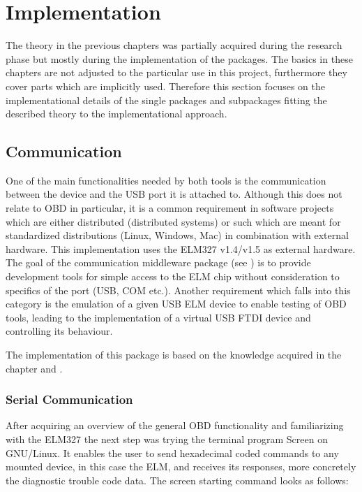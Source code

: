 
\chapter{Implementation}
\label{sec:impl}
The theory in the previous chapters was partially acquired during the research phase but mostly during the implementation of the packages. 
The basics in these chapters are not adjusted to the particular use in this project, furthermore they cover parts which are implicitly used. 
Therefore this section focuses on the implementational details of the single packages and subpackages fitting the described theory to the 
implementational approach.

\section{Communication}
\label{sec:comm}
One of the main functionalities needed by both tools is the communication between the device and the USB port it is attached to. Although this does not relate 
to OBD in particular, it is a common requirement in software projects which are either distributed (distributed systems) or such which are 
meant for standardized distributions (Linux, Windows, Mac) in combination with external hardware. This implementation uses the ELM327 v1.4/v1.5 \cite{ELM} 
as external hardware. The goal of the communication middleware package (see ) is to provide development tools for simple access 
to the ELM chip without consideration to specifics of the port (USB, COM etc.). Another requirement which falls into this category is the emulation 
of a given USB ELM device to enable testing of OBD tools, leading to the implementation of a virtual USB FTDI device and controlling its behaviour.

The implementation of this package is based on the knowledge acquired in the chapter  and .

\subsection{Serial Communication}
\label{sec:serialComm}
After acquiring an overview of the general OBD functionality and familiarizing with the ELM327 the next step was trying the terminal program 
Screen \cite{SCREEN} on GNU/Linux. It enables the user to send hexadecimal coded commands to any mounted device, in this case the ELM, and receives its responses, 
more concretely the diagnostic trouble code data. The screen starting command looks as follows:

